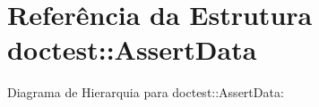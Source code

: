 \hypertarget{structdoctest_1_1AssertData}{}\section{Referência da Estrutura doctest\+:\+:Assert\+Data}
\label{structdoctest_1_1AssertData}


Diagrama de Hierarquia para doctest\+:\+:Assert\+Data\+:
